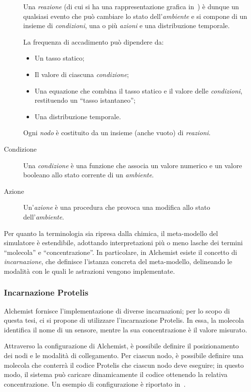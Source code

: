 \begin{description}
        Una \emph{reazione} (di cui si ha una rappresentazione grafica in~) è dunque un qualsiasi evento che può cambiare lo stato dell'\emph{ambiente} e si compone di un insieme di \emph{condizioni}, una o più \emph{azioni} e una distribuzione temporale.

        La frequenza di accadimento può dipendere da:
        \begin{itemize}
            \item Un tasso statico;
            \item Il valore di ciascuna \emph{condizione};
            \item Una equazione che combina il tasso statico e il valore delle \emph{condizioni}, restituendo un ``tasso istantaneo'';
            \item Una distribuzione temporale.
        \end{itemize}

        Ogni \emph{nodo} è costituito da un insieme (anche vuoto) di \emph{reazioni}.

      \item[Condizione]\label{itm:cond}
        Una \emph{condizione} è una funzione che associa un valore numerico e un valore booleano allo stato corrente di un \emph{ambiente}.

      \item[Azione]\label{itm:act}
        Un'\emph{azione} è una procedura che provoca una modifica allo stato dell'\emph{ambiente}.

    \end{description}

    Per quanto la terminologia sia ripresa dalla chimica, il meta-modello del simulatore è estendibile, adottando interpretazioni più o meno lasche dei termini ``molecola'' e ``concentrazione''.
    In particolare, in Alchemist esiste il concetto di \emph{incarnazione}, che definisce l'istanza concreta del meta-modello, delineando le modalità con le quali le astrazioni vengono implementate.

  \subsubsection{Incarnazione Protelis}

  Alchemist fornisce l'implementazione di diverse incarnazioni;
  per lo scopo di questa tesi, ci si propone di utilizzare l'incarnazione Protelis.
  In essa, la molecola identifica il nome di un sensore, mentre la sua concentrazione è il valore misurato.

  Attraverso la configurazione di Alchemist, è possibile definire il posizionamento dei nodi e le modalità di collegamento.
  Per ciascun nodo, è possibile definire una molecola che conterrà il codice Protelis che ciascun nodo deve eseguire;
  in questo modo, il sistema può caricare dinamicamente il codice ottenendo la relativa concentrazione.
  Un esempio di configurazione è riportato in~.
